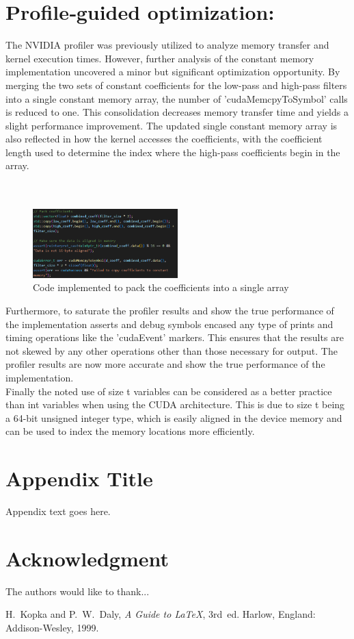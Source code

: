 \documentclass[journal,11pt]{IEEEtran}
\begin{document}
\section{Profile‐guided optimization:}
The NVIDIA profiler was previously utilized to analyze memory transfer and kernel execution times. However, further analysis of the constant memory implementation uncovered a minor but significant optimization opportunity. By merging the two sets of constant coefficients for the low-pass and high-pass filters into a single constant memory array, the number of 'cudaMemcpyToSymbol' calls is reduced to one. This consolidation decreases memory transfer time and yields a slight performance improvement. The updated single constant memory array is also reflected in how the kernel accesses the coefficients, with the coefficient length used to determine the index where the high-pass coefficients begin in the array.\\\\\\

\begin{figure}[h]
    \centering
    \includegraphics[width=0.5\textwidth]{assets/packed-coeffs.png}
    \caption{Code implemented to pack the coefficients into a single array}
    \label{fig:8}
\end{figure}
\vspace{-1.5em}
Furthermore, to saturate the profiler results and show the true performance of the implementation asserts and debug symbols encased any type of prints and timing operations like the 'cudaEvent' markers. This ensures that the results are not skewed by any other operations other than those necessary for output. The profiler results are now more accurate and show the true performance of the implementation.\\

Finally the noted use of size t variables can be considered as a better practice than int variables when using the CUDA architecture. This is due to size t being a 64-bit unsigned integer type, which is easily aligned in the device memory and can be used to index the memory locations more efficiently. 

\appendices
\section{Appendix Title}
Appendix text goes here.

\section*{Acknowledgment}
The authors would like to thank...

\begin{thebibliography}{1}

H.~Kopka and P.~W.~Daly, \emph{A Guide to \LaTeX}, 3rd~ed. Harlow, England: Addison-Wesley, 1999.

\end{thebibliography}
\end{document}
